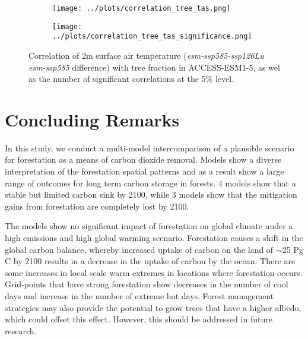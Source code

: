 \documentclass[]{article}
\begin{document}
\begin{figure}[H]
    \centering
    \begin{subfigure}[b]{0.5\linewidth}
        \texttt{[image: ../plots/correlation\_tree\_tas.png]}
    \end{subfigure}

    \begin{subfigure}[b]{0.5\linewidth}
        \texttt{[image: ../plots/correlation\_tree\_tas\_significance.png]}
    \end{subfigure}
    \caption{Correlation of 2m surface air temperature (\textit{esm-ssp585-ssp126Lu} \textit{esm-ssp585} difference) with tree fraction in ACCESS-ESM1-5, as wel as the number of significant correlations at the 5\% level.}
    \label{fig:map_tas_tree_correlation}
\end{figure}

\section{Concluding Remarks}

In this study, we conduct a multi-model intercomparison of a plausible scenario for forestation as a means of carbon dioxide removal.
Models show a diverse interpretation of the forestation spatial patterns and as a result show a large range of outcomes for long term carbon storage in forests.
4 models show that a stable but limited carbon sink by 2100, while 3 models show that the mitigation gains from forestation are completely lost by 2100.

The models show no significant impact of forestation on global climate under a high emissions and high global warming scenario.
Forestation causes a shift in the global carbon balance, whereby increased uptake of carbon on the land of $\sim$25 Pg C by 2100 results in a decrease in the uptake of carbon by the ocean.
There are some increases in local scale warm extremes in locations where forestation occurs.
Grid-points that have strong forestation show decreases in the number of cool days and increase in the number of extreme hot days.
Forest management strategies may also provide the potential to grow trees that have a higher albedo, which could offset this effect.
However, this should be addressed in future research.
\end{document}
